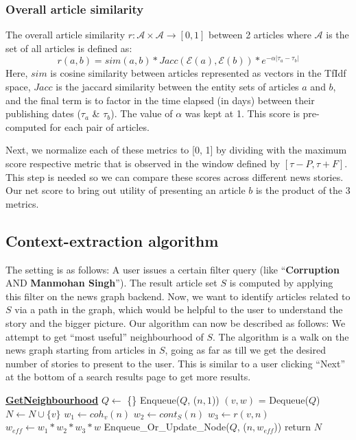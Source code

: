 \subsubsection*{Overall article similarity}
\label{subsec:article_similarity}
The overall article similarity $r:\mathcal{A} \times \mathcal{A} \rightarrow [0,1]$ between 2 articles where $\mathcal{A}$ is the set of all articles is defined as:
\begin{equation}
r(a, b) = sim(a,b) * Jacc(\mathcal{E}(a), \mathcal{E}(b)) * e^{-\alpha|\tau_a - \tau_b|}
\end{equation}
Here, $sim$ is cosine similarity between articles represented as vectors in the TfIdf space, $Jacc$ is the jaccard similarity between
the entity sets of articles $a$ and $b$, and the final term is to factor in the time elapsed (in days) between their publishing dates ($\tau_a$ \& $\tau_b$).
The value of $\alpha$ was kept at 1. This score is pre-computed for each pair of articles. 

Next, we normalize each of these metrics to [0, 1] by dividing with the maximum score respective metric that is observed in the window defined by $[\tau - P, \tau + F]$. This
step is needed so we can compare these scores across different news stories. Our net score to bring out utility of presenting an article $b$ is the product of the 3 metrics.
\subsection{Context-extraction algorithm}
The setting is as follows: A user issues a certain filter query (like ``{\bf Corruption} AND {\bf Manmohan Singh}''). The result article set $S$ is computed by applying this filter on the news graph backend. Now, we want to identify articles
related to $S$ via a path in the graph, which would be helpful to the user to understand the story and the bigger picture.
Our algorithm can now be described as follows: We attempt to get ``most useful'' neighbourhood of $S$. The algorithm is a walk on the news graph starting from articles in $S$, 
going as far as till we get the desired number of stories to present to the user. This is similar to a user clicking ``Next'' at the bottom of a search results page to get more results. 

\begin{algorithmic}
  \State \textbf{\underline{GetNeighbourhood}}
  \State {}
  \State {}
    \State $Q \leftarrow$ \{\} 
      \State Enqueue($Q$, ($n, 1$))
    \EndFor
      \State $(v, w)$ = Dequeue($Q$)
      \State $N \leftarrow N \cup \{v\}$
        \State $w_1 \leftarrow coh_{v}(n)$
        \State $w_2 \leftarrow cont_{S}(n)$
        \State $w_3 \leftarrow r(v,n)$
        \State $w_{eff} \leftarrow w_1 * w_2 * w_3 * w$
        \State Enqueue\_Or\_Update\_Node($Q$, ($n, w_{eff}$))
      \EndFor
    \EndWhile
    \State return $N$
\end{algorithmic}

